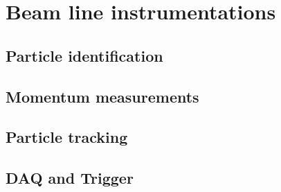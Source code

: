 \section{Beam line instrumentations}
\label{sec:beaminstruments}

\subsection{Particle identification}

\subsection{Momentum measurements}

\subsection{Particle tracking}

\subsection{DAQ and Trigger}





